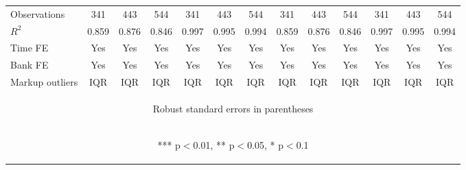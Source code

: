 \documentclass[]{article}
\begin{document}
\begin{center}
\begin{tabular}{lcccccccccccc}
Observations & 341 & 443 & 544 & 341 & 443 & 544 & 341 & 443 & 544 & 341 & 443 & 544 \\
$R^2$ & 0.859 & 0.876 & 0.846 & 0.997 & 0.995 & 0.994 & 0.859 & 0.876 & 0.846 & 0.997 & 0.995 & 0.994 \\
Time FE & Yes & Yes & Yes & Yes & Yes & Yes & Yes & Yes & Yes & Yes & Yes & Yes \\
Bank FE & Yes & Yes & Yes & Yes & Yes & Yes & Yes & Yes & Yes & Yes & Yes & Yes \\
 Markup outliers & IQR & IQR & IQR & IQR & IQR & IQR & IQR & IQR & IQR & IQR & IQR & IQR \\ \hline
\multicolumn{13}{c}{\begin{footnotesize} Robust standard errors in parentheses\end{footnotesize}} \\
\multicolumn{13}{c}{\begin{footnotesize} *** p$<$0.01, ** p$<$0.05, * p$<$0.1\end{footnotesize}} \\
\end{tabular}
\end{center}
\end{document}
